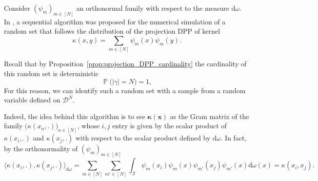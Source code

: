\documentclass[twoside,11pt]{book}
\numberwithin{theorem}{chapter}
\numberwithin{definition}{chapter}
\numberwithin{proposition}{chapter}
\numberwithin{corollary}{chapter}
\numberwithin{example}{chapter}
\numberwithin{lemma}{chapter}
\numberwithin{assumption}{chapter}
\DeclareMathOperator{\Tran}{\intercal}
\DeclareMathOperator{\Prb}{\mathbb{P}}
\DeclareMathOperator*{\KDPP}{\mathfrak{K}}
\newcommand{\ar}[1]{\textcolor{magenta}{~\algoremark{#1}}}
\begin{document}




Consider $(\psi_{m})_{m \in [N]}$ an orthonormal family with respect to the measure $\mathrm{d}\omega$. In \citep*{HoKrPeVi06}, a sequential algorithm was proposed for the numerical simulation of a random set that follows the distribution of the projection DPP of  kernel
\begin{equation}
\kappa(x,y) = \sum\limits_{m \in [N]} \psi_{m}(x)\psi_{m}(y).
\end{equation}

Recall that by Proposition~\ref{prop:projection_DPP_cardinality} the cardinality of this random set is deterministic  
 \begin{equation}
\Prb \big( |\gamma| = N \big) = 1,
 \end{equation}
For this reason, we can identify such a random set with a sample from a random variable defined on $\mathcal{D}^{N}$.
 
Indeed, the idea behind this algorithm is to see $\bm{\kappa}(\bm{x})$ as the Gram matrix of the family $\big(\kappa(x_{n},.)\big)_{n \in [N]}$, whose $i,j$ entry is given by the scalar product of $\kappa(x_{i},.)$ and $\kappa(x_{j},.)$ with respect to the scalar product defined by $\mathrm{d}\omega$. In fact, by the orthonormality of $(\psi_{m})_{m \in [N]}$
\begin{equation}
\Big\langle \kappa(x_{i},.),\kappa(x_{j},.) \Big\rangle_{\mathrm{d}\omega}  = \sum\limits_{m \in [N]}\sum\limits_{m' \in [N]} \int_{\mathcal{X}} \psi_{m}(x_{i}) \psi_{m}(x) \psi_{m'}(x_{j}) \psi_{m'}(x) \mathrm{d}\omega(x)  = \kappa(x_{i},x_{j}).
\end{equation}
\end{document}
